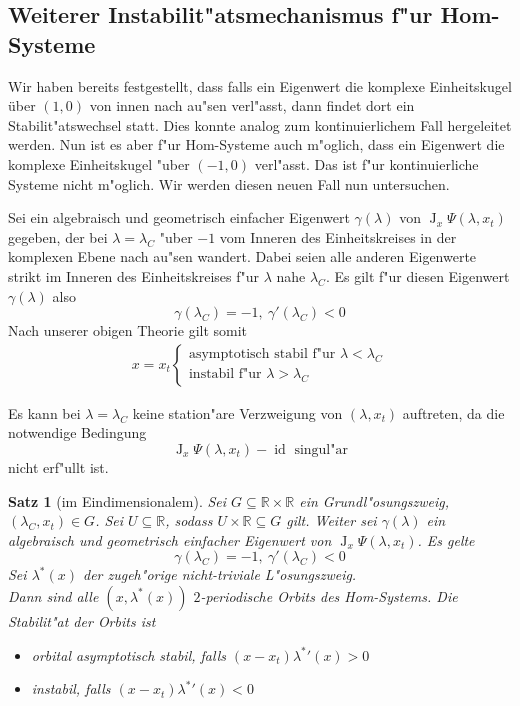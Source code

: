 \documentclass[a4paper, 13pt]{scrreprt}
\newtheorem{satz}{Satz}[section]
\theoremstyle{definition} \newtheorem{definition}{Definition}[section]
\newenvironment{bemerkung}[1][Bemerkung]{\begin{trivlist}
\item[\hskip \labelsep {\bfseries #1}]}{\end{trivlist}}
\newcommand{\RR}{\mathbb{R}}
\begin{document}
\subsection{Weiterer Instabilit"atsmechanismus f"ur Hom-Systeme}
Wir haben bereits festgestellt, dass falls ein Eigenwert die komplexe Einheitskugel über $(1,0)$ von innen nach au"sen verl"asst, dann findet dort ein Stabilit"atswechsel statt. Dies konnte analog zum kontinuierlichem Fall hergeleitet werden. Nun ist es aber f"ur Hom-Systeme auch m"oglich, dass ein Eigenwert die komplexe Einheitskugel "uber $(-1,0)$ verl"asst. Das ist f"ur kontinuierliche Systeme nicht m"oglich. Wir werden diesen neuen Fall nun untersuchen. 


Sei ein algebraisch und geometrisch einfacher Eigenwert $\gamma(\lambda)$ von $\operatorname{J}_x\Psi(\lambda,x_t)$ gegeben, der bei $\lambda=\lambda_C$ "uber $-1$ vom Inneren des Einheitskreises in der komplexen Ebene nach au"sen wandert. Dabei seien alle anderen Eigenwerte strikt im Inneren des Einheitskreises f"ur $\lambda$ nahe $\lambda_C$. Es gilt f"ur diesen Eigenwert $\gamma(\lambda)$ also
\[\gamma(\lambda_C)=-1,  \ \gamma'(\lambda_C)<0\]
Nach unserer obigen Theorie gilt somit 
\begin{align*}
x=x_t\begin{cases} \text{asymptotisch stabil f"ur } \lambda<\lambda_C\\
\text{instabil f"ur } \lambda>\lambda_C\end{cases}
\end{align*}

\begin{bemerkung}
Es kann bei $\lambda=\lambda_C$ keine station"are Verzweigung von $(\lambda,x_t)$ auftreten, da die notwendige Bedingung 
\[\operatorname{J}_x\Psi(\lambda,x_t)-\operatorname{id}\text{ singul"ar}\]
nicht erf"ullt ist.
\end{bemerkung}

\begin{satz}[im Eindimensionalem]
Sei $G\subseteq\RR\times\RR$ ein Grundl"osungszweig, $(\lambda_C, x_t) \in G$. Sei $U \subseteq \RR$, sodass $U\times\RR \subseteq G$ gilt. Weiter sei $\gamma(\lambda)$ ein algebraisch und geometrisch einfacher Eigenwert von $\operatorname{J}_x\Psi(\lambda, x_t)$. Es gelte
$$ \gamma(\lambda_C) = -1, \ \gamma'(\lambda_C) < 0$$
Sei $\lambda^*(x)$ der zugeh"orige nicht-triviale L"osungszweig.\\
Dann sind alle $(x, \lambda^*(x))$ $2$-periodische Orbits des Hom-Systems. Die Stabilit"at der Orbits ist 
\begin{itemize}
\item orbital asymptotisch stabil, falls $(x-x_t){\lambda^*}'(x) > 0$
\item instabil, falls $(x-x_t){\lambda^*}'(x) < 0$
\end{itemize}
\end{satz}
\end{document}
